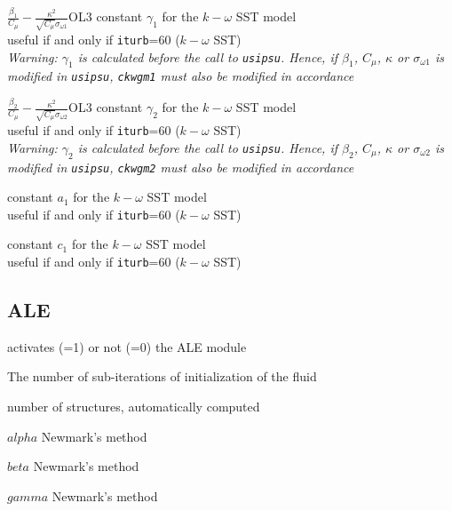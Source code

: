 {$\frac{\beta_1}{C_\mu}-\frac{\kappa^2}{\sqrt{C_\mu}\sigma_{\omega 1}}$}{O}{L3}
{constant $\gamma_1$ for the $k-\omega$ SST model\\
useful if and only if {\tt iturb}=60
($k-\omega$ SST)\\
{\em Warning: $\gamma_1$ is calculated before the call to
\texttt{usipsu}. Hence, if $\beta_1$, $C_\mu$, $\kappa$ or $\sigma_{\omega 1}$
is modified in \texttt{usipsu}, \texttt{ckwgm1} must also be modified in accordance}}

{$\frac{\beta_2}{C_\mu}-\frac{\kappa^2}{\sqrt{C_\mu}\sigma_{\omega 2}}$}{O}{L3}
{constant $\gamma_2$ for the $k-\omega$ SST model\\
useful if and only if {\tt iturb}=60
($k-\omega$ SST)\\
{\em Warning: $\gamma_2$ is calculated before the call to
\texttt{usipsu}. Hence, if $\beta_2$, $C_\mu$, $\kappa$ or $\sigma_{\omega 2}$
is modified in \texttt{usipsu}, \texttt{ckwgm2} must also be modified in
accordance}}

{constant $a_1$ for the $k-\omega$ SST model\\
useful if and only if {\tt iturb}=60
($k-\omega$ SST)}

{constant $c_1$ for the $k-\omega$ SST model\\
useful if and only if {\tt iturb}=60
($k-\omega$ SST)}


\subsection{ALE}
{activates (=1) or not (=0)  the ALE module}

{The number of sub-iterations of initialization of the fluid}

{number of structures, automatically computed}

{$alpha$ Newmark's method}

{$beta$ Newmark's method}

{$gamma$ Newmark's method}

